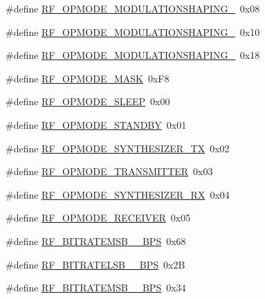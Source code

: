 \begin{DoxyCompactItemize}
\item 
\#define \mbox{\hyperlink{sx1276_regs-_fsk_8h_a19fca1c14eed0e9a8879aaef7a27e05f}{R\+F\+\_\+\+O\+P\+M\+O\+D\+E\+\_\+\+M\+O\+D\+U\+L\+A\+T\+I\+O\+N\+S\+H\+A\+P\+I\+N\+G\+\_}}~0x08
\item 
\#define \mbox{\hyperlink{sx1276_regs-_fsk_8h_a07bd0112f429ed1340afabbb6d511da3}{R\+F\+\_\+\+O\+P\+M\+O\+D\+E\+\_\+\+M\+O\+D\+U\+L\+A\+T\+I\+O\+N\+S\+H\+A\+P\+I\+N\+G\+\_}}~0x10
\item 
\#define \mbox{\hyperlink{sx1276_regs-_fsk_8h_a9f1f93b87462b90bcbccba6a26400c89}{R\+F\+\_\+\+O\+P\+M\+O\+D\+E\+\_\+\+M\+O\+D\+U\+L\+A\+T\+I\+O\+N\+S\+H\+A\+P\+I\+N\+G\+\_}}~0x18
\item 
\#define \mbox{\hyperlink{sx1276_regs-_fsk_8h_a85461827ea27e5138c9198c75f1bdf6e}{R\+F\+\_\+\+O\+P\+M\+O\+D\+E\+\_\+\+M\+A\+SK}}~0x\+F8
\item 
\#define \mbox{\hyperlink{sx1276_regs-_fsk_8h_a2b5cd905a9116a8a462c28a2d17c483a}{R\+F\+\_\+\+O\+P\+M\+O\+D\+E\+\_\+\+S\+L\+E\+EP}}~0x00
\item 
\#define \mbox{\hyperlink{sx1276_regs-_fsk_8h_a8061431d06917243c6409c4a014c3592}{R\+F\+\_\+\+O\+P\+M\+O\+D\+E\+\_\+\+S\+T\+A\+N\+D\+BY}}~0x01
\item 
\#define \mbox{\hyperlink{sx1276_regs-_fsk_8h_ab384b4d4a5a2e55a8a6eadf18e00e8db}{R\+F\+\_\+\+O\+P\+M\+O\+D\+E\+\_\+\+S\+Y\+N\+T\+H\+E\+S\+I\+Z\+E\+R\+\_\+\+TX}}~0x02
\item 
\#define \mbox{\hyperlink{sx1276_regs-_fsk_8h_a9851bc9741460e2c48415a59f9e3f5ba}{R\+F\+\_\+\+O\+P\+M\+O\+D\+E\+\_\+\+T\+R\+A\+N\+S\+M\+I\+T\+T\+ER}}~0x03
\item 
\#define \mbox{\hyperlink{sx1276_regs-_fsk_8h_a7257f5b516d9fe4c292a87c569ac1519}{R\+F\+\_\+\+O\+P\+M\+O\+D\+E\+\_\+\+S\+Y\+N\+T\+H\+E\+S\+I\+Z\+E\+R\+\_\+\+RX}}~0x04
\item 
\#define \mbox{\hyperlink{sx1276_regs-_fsk_8h_a7a13dffe3a61d783cdbbb0ac11cc85b2}{R\+F\+\_\+\+O\+P\+M\+O\+D\+E\+\_\+\+R\+E\+C\+E\+I\+V\+ER}}~0x05
\item 
\#define \mbox{\hyperlink{sx1276_regs-_fsk_8h_abefe1b1960c632cccac981eed31ddfdf}{R\+F\+\_\+\+B\+I\+T\+R\+A\+T\+E\+M\+S\+B\+\_\+\_\+\+B\+PS}}~0x68
\item 
\#define \mbox{\hyperlink{sx1276_regs-_fsk_8h_a61be3af220402958165d9e69f7f506c6}{R\+F\+\_\+\+B\+I\+T\+R\+A\+T\+E\+L\+S\+B\+\_\+\_\+\+B\+PS}}~0x2B
\item 
\#define \mbox{\hyperlink{sx1276_regs-_fsk_8h_af1a5b1f28fc382c9df4d6e482b448c3c}{R\+F\+\_\+\+B\+I\+T\+R\+A\+T\+E\+M\+S\+B\+\_\+\_\+\+B\+PS}}~0x34

\end{DoxyCompactItemize}
